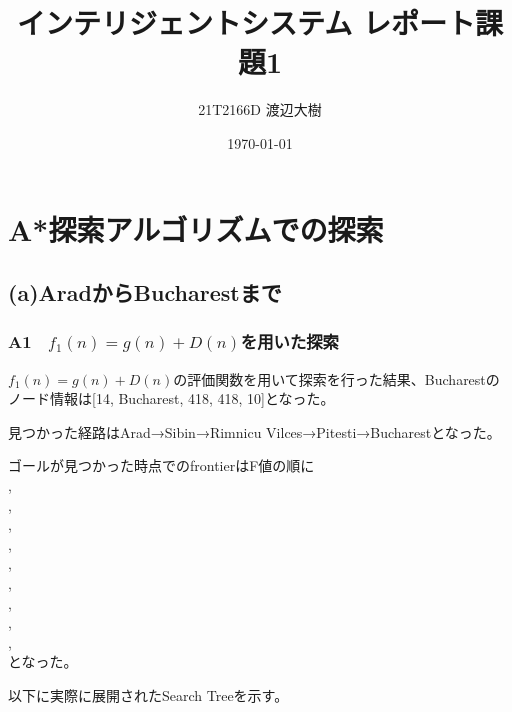 \documentclass[a4paper,11pt,dvipdfmx]{jsarticle}
\begin{document}
\title{インテリジェントシステム レポート課題1}
\author{21T2166D 渡辺大樹}
\date{\today}
\maketitle
\section{A*探索アルゴリズムでの探索}
\subsection{(a)AradからBucharestまで}
\subsubsection{A1　$f_1(n)=g(n)+D(n)$を用いた探索}
$f_1(n)=g(n)+D(n)$の評価関数を用いて探索を行った結果、Bucharestのノード情報は[14, Bucharest, 418, 418, 10]となった。

見つかった経路はArad→Sibin→Rimnicu Vilces→Pitesti→Bucharestとなった。

ゴールが見つかった時点でのfrontierはF値の順に \\ \noindent
[3, Timisoara, 118, 447, 1], \\ \noindent
[4, Zerind, 75, 449, 1], \\ \noindent
[9, Craiova, 366, 526, 8], \\ \noindent
[11, Sibiu, 300, 553, 8], \\ \noindent
[13, Sibiu, 338, 591, 6], \\ , \\ \noindent
[15, Craiova, 455, 615, 10], \\ \noindent
[5, Arad, 280, 646, 2], \\ \noindent
[7, Oradea, 291, 671, 2], \\ \noindent
となった。

以下に実際に展開されたSearch Treeを示す。
\end{document}
